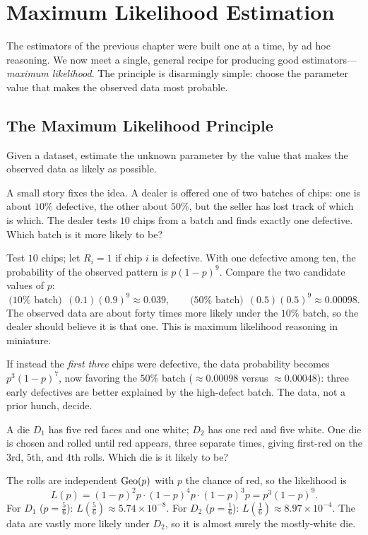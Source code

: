 \chapter{Maximum Likelihood Estimation}
\label{ch:mle}

The estimators of the previous chapter were built one at a time, by ad hoc
reasoning. We now meet a single, general recipe for producing good
estimators—\emph{maximum likelihood}. The principle is disarmingly simple:
choose the parameter value that makes the observed data most probable.

\section{The Maximum Likelihood Principle}

\begin{principle}
Given a dataset, estimate the unknown parameter by the value that makes the
observed data as likely as possible.
\end{principle}

A small story fixes the idea. A dealer is offered one of two batches of chips:
one is about $10\%$ defective, the other about $50\%$, but the seller has lost
track of which is which. The dealer tests $10$ chips from a batch and finds
exactly one defective. Which batch is it more likely to be?

\begin{example}
Test $10$ chips; let $R_i=1$ if chip $i$ is defective. With one defective among
ten, the probability of the observed pattern is $p(1-p)^9$. Compare the two
candidate values of $p$:
\[
  \text{($10\%$ batch)}\ \ (0.1)(0.9)^9\approx 0.039,\qquad
  \text{($50\%$ batch)}\ \ (0.5)(0.5)^9\approx 0.00098.
\]
The observed data are about forty times more likely under the $10\%$ batch, so
the dealer should believe it is that one. This is maximum likelihood reasoning in
miniature.

If instead the \emph{first three} chips were defective, the data probability
becomes $p^3(1-p)^7$, now favoring the $50\%$ batch ($\approx 0.00098$ versus
$\approx 0.00048$): three early defectives are better explained by the
high-defect batch. The data, not a prior hunch, decide.
\end{example}

\begin{example}
A die $D_1$ has five red faces and one white; $D_2$ has one red and five white.
One die is chosen and rolled until red appears, three separate times, giving
first-red on the $3$rd, $5$th, and $4$th rolls. Which die is it likely to be?

\solution The rolls are independent $\mathrm{Geo}(p)$ with $p$ the chance of red, so the
likelihood is
\[
  L(p)=(1-p)^2 p\cdot(1-p)^4 p\cdot(1-p)^3 p=p^3(1-p)^9.
\]
For $D_1$ ($p=\tfrac56$): $L(\tfrac56)\approx 5.74\times10^{-8}$. For $D_2$
($p=\tfrac16$): $L(\tfrac16)\approx 8.97\times10^{-4}$. The data are vastly more
likely under $D_2$, so it is almost surely the mostly-white die.
\end{example}

